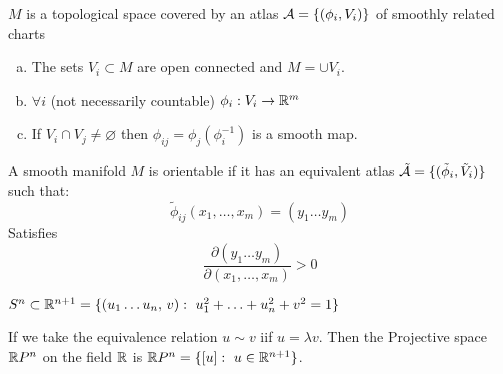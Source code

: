 \documentclass{beamer}
\begin{document}
\begin{frame}
\begin{ddef}
$M$ is a topological space covered by an atlas $\mathcal{A}=\{(\phi_i, V_i)\}$ of smoothly related charts
\begin{enumerate}[a)]
\item  The sets $V_i\subset M$ are open connected and $M=\cup V_i$.
\item $\forall i$ (not necessarily countable) $\phi_i:V_i\to \mathbb{R}^m$
\item If $V_i\cap V_j \neq \varnothing$ then $\phi_{ij} = \phi_j(\phi_i^{-1})$ is a smooth map.   
\end{enumerate}
\end{ddef}
\begin{ddef}[Orientability]
A smooth manifold $M$ is orientable if it has an equivalent atlas $\tilde{\mathcal{A}}=\{(\tilde{\phi}_i, \tilde{V}_i)\}$ such that: 
    $$\tilde{\phi}_{ij}(x_1,\ldots,x_m)= (y_1\ldots y_m)$$
    Satisfies
    $$\frac{\partial(y_1\ldots y_m)}{\partial(x_1,\ldots,x_m)}>0$$
\end{ddef}
\end{frame}
\begin{frame}
\begin{ddef}[$S^n$]
$S^n\subset \mathbb{R}^{n+1} =\{ (u_1\ldots u_n,\, v): \ u_1^2 +\ldots + u_n^2 + v^2 =1\}$
\end{ddef}
\end{frame}
\begin{frame}
\begin{ddef}
If we take the equivalence relation $u \sim v$ iif $u=\lambda v$. Then the Projective space $\mathbb{R} P^n$ on the field $\mathbb{R}$ is $\mathbb{R} P^n = \{ [u]:\ u\in \mathbb{R}^{n+1}\}$.
\end{ddef}
\end{frame}
\end{document}
